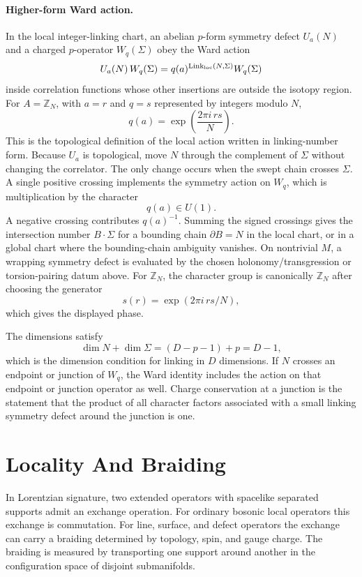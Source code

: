 \paragraph{Higher-form Ward action.}
In the local integer-linking chart, an abelian \(p\)-form symmetry defect
\(U_a(N)\) and a charged \(p\)-operator \(W_q(\Sigma)\) obey the Ward action
\[
  U_a(N)\,W_q(\Sigma)
  =
  q(a)^{\operatorname{Link}_{\rm loc}(N,\Sigma)}
  W_q(\Sigma)
\]
inside correlation functions whose other insertions are outside the isotopy
region.  For \(A=\mathbb Z_N\), with \(a=r\) and \(q=s\) represented by
integers modulo \(N\),
\[
  q(a)=\exp\left(\frac{2\pi i\,rs}{N}\right).
\]
This is the topological definition of the local action written in
linking-number form.  Because \(U_a\) is topological, move \(N\) through the
complement of \(\Sigma\) without changing the correlator.  The only change
occurs when the swept chain crosses \(\Sigma\).  A single positive crossing
implements the symmetry action on \(W_q\), which is multiplication by the
character
\[
  q(a)\in U(1).
\]
A negative crossing contributes \(q(a)^{-1}\).  Summing the signed crossings
gives the intersection number \(B\cdot\Sigma\) for a bounding chain
\(\partial B=N\) in the local chart, or in a global chart where the
bounding-chain ambiguity vanishes.  On nontrivial \(M\), a wrapping symmetry
defect is evaluated by the chosen holonomy/transgression or torsion-pairing
datum above.
For \(\mathbb Z_N\), the character group is canonically \(\mathbb Z_N\) after
choosing the generator
\[
s(r)=\exp(2\pi i\,rs/N),
\]
which gives the displayed phase.

The dimensions satisfy
\[
  \dim N+\dim\Sigma=(D-p-1)+p=D-1,
\]
which is the dimension condition for linking in \(D\) dimensions.  If
\(N\) crosses an endpoint or junction of \(W_q\), the Ward identity includes
the action on that endpoint or junction operator as well.  Charge
conservation at a junction is the statement that the product of all character
factors associated with a small linking symmetry defect around the junction
is one.

\section{Locality And Braiding}

In Lorentzian signature, two extended operators with spacelike separated
supports admit an exchange operation.  For ordinary bosonic local operators
this exchange is commutation.  For line, surface, and defect operators the
exchange can carry a braiding determined by topology, spin, and gauge charge.
The braiding is measured by transporting one support around another in the
configuration space of disjoint submanifolds.

